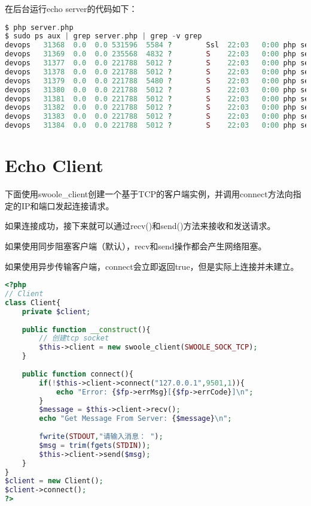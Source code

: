 在后台运行echo server的代码如下：

\begin{lstlisting}[language=PHP]
$ php server.php
$ sudo ps aux | grep server.php | grep -v grep
devops   31368  0.0  0.0 531596  5584 ?        Ssl  22:03   0:00 php server.php
devops   31369  0.0  0.0 235568  4832 ?        S    22:03   0:00 php server.php
devops   31377  0.0  0.0 221788  5012 ?        S    22:03   0:00 php server.php
devops   31378  0.0  0.0 221788  5012 ?        S    22:03   0:00 php server.php
devops   31379  0.0  0.0 221788  5480 ?        S    22:03   0:00 php server.php
devops   31380  0.0  0.0 221788  5012 ?        S    22:03   0:00 php server.php
devops   31381  0.0  0.0 221788  5012 ?        S    22:03   0:00 php server.php
devops   31382  0.0  0.0 221788  5012 ?        S    22:03   0:00 php server.php
devops   31383  0.0  0.0 221788  5012 ?        S    22:03   0:00 php server.php
devops   31384  0.0  0.0 221788  5012 ?        S    22:03   0:00 php server.php
\end{lstlisting}


\section{Echo Client}

下面使用swoole\_client创建一个基于TCP的客户端实例，并调用connect方法向指定的IP和端口发起连接请求。

如果连接成功，接下来就可以通过recv()和send()方法来接收和发送请求。

\begin{compactitem}
\item 如果使用同步阻塞客户端（默认），recv和send操作都会产生网络阻塞。
\item 如果使用异步传输客户端，connect会立即返回true，但是实际上连接并未建立。
\end{compactitem}

\begin{lstlisting}[language=PHP]
<?php
// Client
class Client{
	private $client;
	
	public function __construct(){
		// 创建tcp socket
		$this->client = new swoole_client(SWOOLE_SOCK_TCP);
	}
	
	public function connect(){
		if(!$this->client->connect("127.0.0.1",9501,1)){
			echo "Error: {$fp->errMsg}[{$fp->errCode}]\n";
		}
		$message = $this->client->recv();
		echo "Get Message From Server: {$message}\n";
		
		fwrite(STDOUT,"请输入消息： ");
		$msg = trim(fgets(STDIN));
		$this->client->send($msg);
	}
}
$client = new Client();
$client->connect();
?>
\end{lstlisting}

